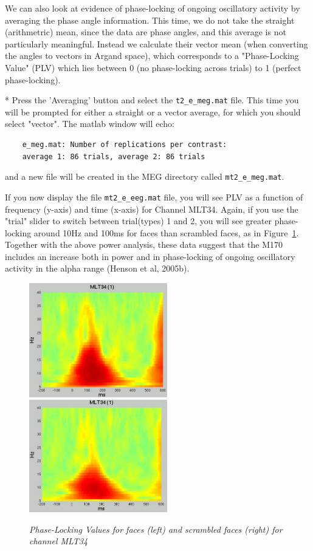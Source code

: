 We can also look at evidence of phase-locking of ongoing oscillatory activity by averaging the phase angle information. This time, we do not take the straight (arithmetric) mean, since the data are phase angles, and this average is not particularly meaningful. Instead we calculate their vector mean (when converting the angles to
vectors in Argand space), which corresponds to a "Phase-Locking Value" (PLV) which lies between 0 (no phase-locking across trials) to 1 (perfect phase-locking).

* Press the 'Averaging' button and select the \verb!t2_e_meg.mat! file. This time you will be prompted for either a straight or a vector average, for which you should select "vector". The matlab window will echo:
\begin{verbatim}
	e_meg.mat: Number of replications per contrast:
	average 1: 86 trials, average 2: 86 trials
\end{verbatim}
	and a new file will be created in the MEG directory called \verb!mt2_e_meg.mat!.

If you now display the file \verb!mt2_e_eeg.mat! file, you will see PLV as a function of frequency (y-axis) and time (x-axis) for Channel MLT34. Again, if you use the "trial" slider to switch between trial(types) 1 and 2, you will see greater phase-locking around 10Hz and 100ms for faces than scrambled faces, as in Figure~\ref{fig_32_14}. Together with the above power analysis, these data suggest that the M170 includes an increase both in power and in phase-locking of ongoing oscillatory activity in the alpha range (Henson et al, 2005b).


\begin{figure}
\begin{center}
\includegraphics[width=60mm]{multimodal/figures/figure_32_14_L}
\includegraphics[width=60mm]{multimodal/figures/figure_32_14_R}
\caption{\em Phase-Locking Values for faces (left) and scrambled faces (right) for channel MLT34 \label{fig_32_14}}
\end{center}
\end{figure}

